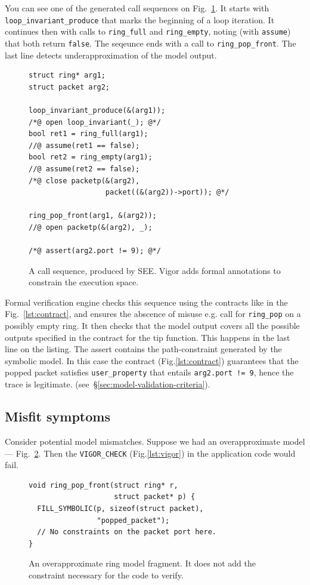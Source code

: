 \documentclass[letterpaper,twocolumn,10pt]{article}
\newcommand{\code}[1]{\lstinline{#1}}
\begin{document}
You can see one of the generated call sequences on Fig.~\ref{lst:call-sequence}.
It starts with \code{loop_invariant_produce} that marks the beginning of a loop
iteration. It continues then with calls to \code{ring_full} and \code{ring_empty},
noting (with \code{assume}) that both return \code{false}. The seqeunce ends
with a call to \code{ring_pop_front}. The last line detects underapproximation
of the model output.
 
\begin{figure}[h]
\begin{lstlisting}
struct ring* arg1;
struct packet arg2;

loop_invariant_produce(&(arg1));
/*@ open loop_invariant(_); @*/
bool ret1 = ring_full(arg1);
//@ assume(ret1 == false);
bool ret2 = ring_empty(arg1);
//@ assume(ret2 == false);
/*@ close packetp(&(arg2),
                  packet((&(arg2))->port)); @*/

ring_pop_front(arg1, &(arg2));
//@ open packetp(&(arg2), _);

/*@ assert(arg2.port != 9); @*/
\end{lstlisting}
  \caption{A call sequence, produced by SEE. Vigor adds formal annotations to
    constrain the execution space.}
  \label{lst:call-sequence}
\end{figure}

Formal verification engine checks this sequence using the contracts like in the
Fig.~\ref{lst:contract}, and ensures the abscence of misuse e.g. call for
\code{ring_pop} on a possibly empty ring. It then checks that the model output
covers all the possible outputs specified in the contract for the tip function.
This happens in the last line on the listing. The assert contains the
path-constraint generated by the symbolic model. In this case the contract
(Fig.\ref{lst:contract}) guarantees that the popped packet satisfies
\code{user_property} that entails \code{arg2.port != 9}, hence the trace is
legitimate. (see~\S\ref{sec:model-validation-criteria}).

\subsection{Misfit symptoms}

Consider potential model mismatches. Suppose we had an overapproximate model ---
Fig.~\ref{lst:overapproximate}. Then the \code{VIGOR_CHECK}
(Fig.\ref{lst:vigor}) in the application code would fail.
\begin{figure}[h!]
\begin{lstlisting}
void ring_pop_front(struct ring* r,
                    struct packet* p) {
  FILL_SYMBOLIC(p, sizeof(struct packet),
                "popped_packet");
  // No constraints on the packet port here.
}
\end{lstlisting}
  \caption{An overapproximate ring model fragment. It does not add the
    constraint necessary for the code to verify.}
  \label{lst:overapproximate}
\end{figure}
\end{document}
